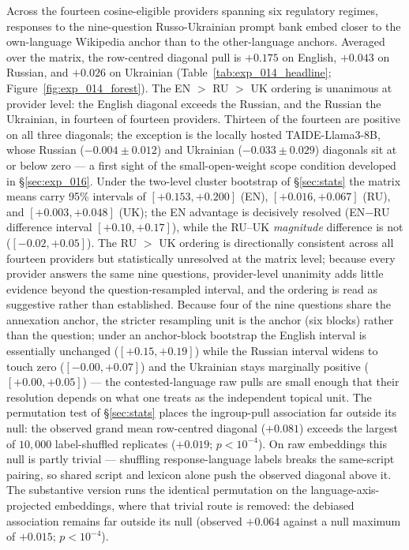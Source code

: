 Across the fourteen cosine-eligible providers spanning six
regulatory regimes, responses to the nine-question Russo-Ukrainian
prompt bank embed closer to the own-language Wikipedia anchor than
to the other-language anchors. Averaged over the matrix, the
row-centred diagonal pull is $+0.175$ on English, $+0.043$ on
Russian, and $+0.026$ on Ukrainian
(Table~\ref{tab:exp_014_headline};
Figure~\ref{fig:exp_014_forest}). The EN ${>}$ RU ${>}$ UK
ordering is unanimous at provider level: the English diagonal
exceeds the Russian, and the Russian the Ukrainian, in fourteen of
fourteen providers. Thirteen of the fourteen are positive on all
three diagonals; the exception is the locally hosted
TAIDE-Llama3-8B, whose Russian ($-0.004 \pm 0.012$) and Ukrainian
($-0.033 \pm 0.029$) diagonals sit at or below zero --- a first
sight of the small-open-weight scope condition developed in
\S\ref{sec:exp_016}. Under the two-level cluster bootstrap of
\S\ref{sec:stats} the matrix means carry 95\% intervals of
$[+0.153, +0.200]$ (EN), $[+0.016, +0.067]$ (RU), and
$[+0.003, +0.048]$ (UK); the EN advantage is decisively resolved
(EN$-$RU difference interval $[+0.10, +0.17]$), while the RU--UK
\emph{magnitude} difference is not ($[-0.02, +0.05]$). The
RU ${>}$ UK ordering is directionally consistent across all
fourteen providers but statistically unresolved at the matrix
level; because every provider answers the same nine questions,
provider-level unanimity adds little evidence beyond the
question-resampled interval, and the ordering is read as
suggestive rather than established. Because four of the nine
questions share the annexation anchor, the stricter resampling unit
is the anchor (six blocks) rather than the question; under an
anchor-block bootstrap the English interval is essentially
unchanged ($[+0.15, +0.19]$) while the Russian interval widens to
touch zero ($[-0.00, +0.07]$) and the Ukrainian stays marginally
positive ($[+0.00, +0.05]$) --- the contested-language raw pulls
are small enough that their resolution depends on what one treats
as the independent topical unit. The permutation test of \S\ref{sec:stats}
places the ingroup-pull association far outside its null: the
observed grand mean row-centred diagonal ($+0.081$) exceeds the
largest of $10{,}000$ label-shuffled replicates ($+0.019$;
$p < 10^{-4}$). On raw embeddings this null is partly trivial ---
shuffling response-language labels breaks the same-script pairing,
so shared script and lexicon alone push the observed diagonal above
it. The substantive version runs the identical permutation on the
language-axis-projected embeddings, where that trivial route is
removed: the debiased association remains far outside its null
(observed $+0.064$ against a null maximum of $+0.015$;
$p < 10^{-4}$).

